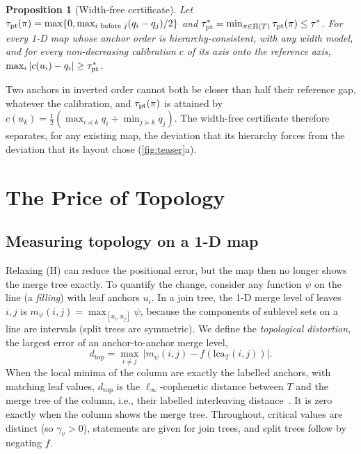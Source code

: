 \documentclass[review]{vgtc}                 %
\newtheorem{proposition}[theorem]{Proposition}
\newcommand{\dtop}{d_{\mathrm{top}}}
\newcommand{\lca}{\mathrm{lca}}
\begin{document}
\begin{proposition}[Width-free certificate]\label{prop:pt}
Let $\tau_{\rm pt}(\pi)=\max\{0,\max_{i\text{ before }j}(q_i-q_j)/2\}$ and $\tau^*_{\rm pt}=\min_{\pi\in\Pi(T)}\tau_{\rm pt}(\pi)\le\tau^*$. For every 1-D map whose anchor order is hierarchy-consistent, with any width model, and for every non-decreasing calibration $c$ of its axis onto the reference axis, $\max_i|c(u_i)-q_i|\ge\tau^*_{\rm pt}$.
\end{proposition}
Two anchors in inverted order cannot both be closer than half their reference gap, whatever the calibration, and $\tau_{\rm pt}(\pi)$ is attained by $c(u_k)=\frac12(\max_{i\preceq k}q_i+\min_{j\succeq k}q_j)$. The width-free certificate therefore separates, for any existing map, the deviation that its hierarchy forces from the deviation that its layout chose (\cref{fig:teaser}a).

\section{The Price of Topology}\label{sec:topo}

\subsection{Measuring topology on a 1-D map}
Relaxing (H) can reduce the positional error, but the map then no longer shows the merge tree exactly. To quantify the change, consider any function $\psi$ on the line (a \emph{filling}) with leaf anchors $u_i$. In a join tree, the 1-D merge level of leaves $i,j$ is $m_\psi(i,j)=\max_{[u_i,u_j]}\psi$, because the components of sublevel sets on a line are intervals (split trees are symmetric). We define the \emph{topological distortion}, the largest error of an anchor-to-anchor merge level,
\[\dtop=\max_{i\neq j}\,\big|m_\psi(i,j)-f(\lca_T(i,j))\big|.\]
When the local minima of the column are exactly the labelled anchors, with matching leaf values, $\dtop$ is the $\ell_\infty$-cophenetic distance between $T$ and the merge tree of the column, i.e., their labelled interleaving distance~\cite{Munch:2019:LINF}. It is zero exactly when the column shows the merge tree. Throughout, critical values are distinct (so $\gamma_v>0$), statements are given for join trees, and split trees follow by negating $f$.
\end{document}
